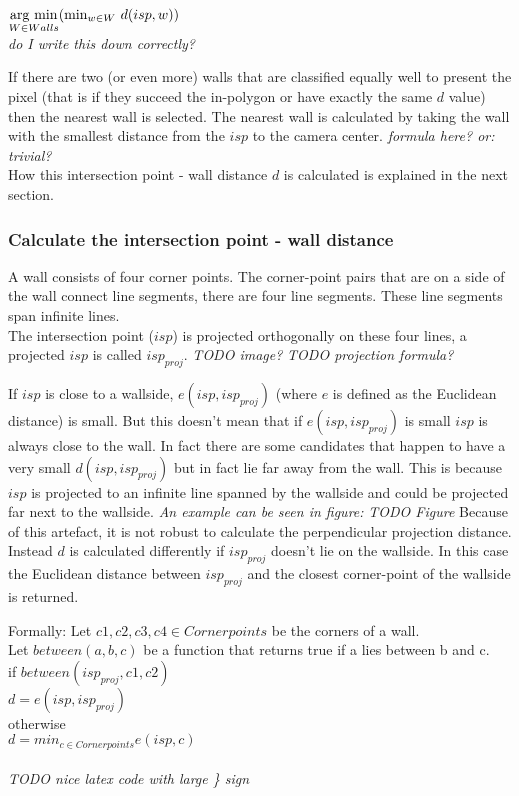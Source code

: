 \documentclass[10pt]{article}
\newcommand{\argmin}[1]{\underset{#1}{\operatorname{arg\ min}}}
\begin{document}
$\argmin{W \in Walls} ( \textnormal{min}_{w\in W}\ d(isp, w) )$\\


\textit{ do I write this down correctly?}


If there are two (or even more) walls that are classified equally well to
present the pixel (that is if they succeed the in-polygon or have exactly the
same $d$ value) then the nearest wall is selected. The nearest wall is
calculated by taking the wall with the smallest distance from the $isp$ to the
camera center.
\textit{ formula here? or: trivial?}\\
How this intersection point - wall distance $d$ is calculated is explained in
the next section.

\subsubsection{Calculate the intersection point - wall distance}
A wall consists of four corner points. The corner-point pairs that are on a
side of the wall connect line segments, there are four line segments. These
line segments span infinite lines.\\

The intersection point ($isp$) is projected orthogonally on these four lines, a
projected $isp$ is called $isp_{proj}$.
\textit{ TODO image?}
\textit{ TODO projection formula?}

If $isp$ is close to a wallside, $e(isp, isp_{proj})$ (where $e$ is defined as
the Euclidean distance) is small.  But this doesn't mean that if
$e(isp,isp_{proj})$ is small $isp$ is always close to the wall. In fact there are
some candidates that happen to have a very small $d(isp, isp_{proj})$ but in fact
lie far away from the wall. This is because $isp$ is projected to an infinite
line spanned by the wallside and could be projected far next to the wallside.
\textit{ An example can be seen in figure:}
\textit{ TODO Figure}
Because of this artefact, it is not robust to calculate the perpendicular
projection distance.  Instead $d$ is calculated differently if $isp_{proj}$
doesn't lie on the wallside.  In this case the Euclidean distance between
$isp_{proj}$ and the closest corner-point of the wallside is returned.

Formally:
Let $c1,c2,c3,c4 \in Cornerpoints$ be the corners of a wall.\\
Let $between(a,b,c)$ be a function that returns true if a lies between b and c.\\
if $between(isp_{proj}, c1, c2)$\\
$d = e(isp, isp_{proj})$\\
otherwise\\
$d = min_{c \in Cornerpoints} e(isp, c)$\\
\\
\textit{TODO nice latex code with large \} sign}\\
\end{document}

